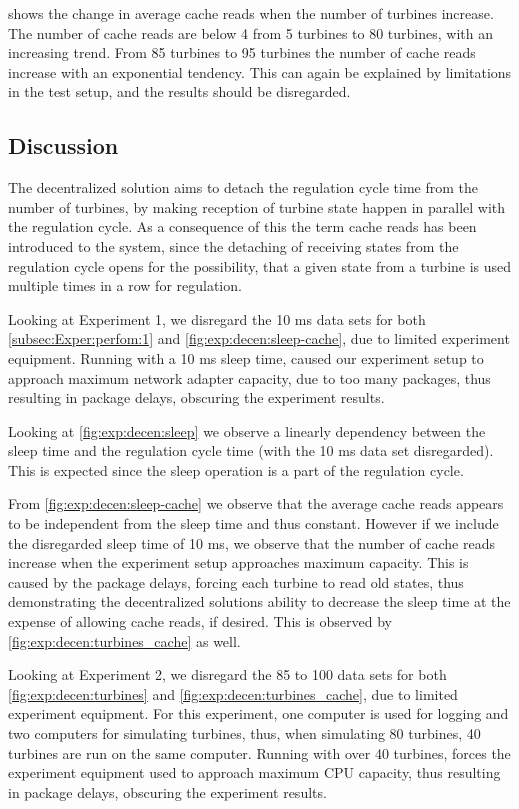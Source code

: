  shows the change in average cache reads when the number of turbines increase. The number of cache reads are below 4 from 5 turbines to 80 turbines, with an increasing trend. From 85 turbines to 95 turbines the number of cache reads increase with an exponential tendency. This can again be explained by limitations in the test setup, and the results should be disregarded.
        
        
\subsection{Discussion} 
The decentralized solution aims to detach the regulation cycle time from the number of turbines, by making reception of turbine state happen in parallel with the regulation cycle. As a consequence of this the term cache reads has been introduced to the system, since the detaching of receiving states from the regulation cycle opens for the possibility, that a given state from a turbine is used multiple times in a row for regulation. 

Looking at Experiment 1, we disregard the 10 ms data sets for both \cref{subsec:Exper:perfom:1} and \cref{fig:exp:decen:sleep-cache}, due to limited experiment equipment. Running with a 10 ms sleep time, caused our experiment setup to approach maximum network adapter capacity, due to too many packages, thus resulting in package delays, obscuring the experiment results.

Looking at \cref{fig:exp:decen:sleep} we observe a linearly dependency between the sleep time and the regulation cycle time (with the 10 ms data set disregarded). This is expected since the sleep operation is a part of the regulation cycle. 

From \cref{fig:exp:decen:sleep-cache} we observe that the average cache reads appears to be independent from the sleep time and thus constant. However if we include the disregarded sleep time of 10 ms, we observe that the number of cache reads increase when the experiment setup approaches maximum capacity. This is caused by the package delays, forcing each turbine to read old states, thus demonstrating the decentralized solutions ability to decrease the sleep time at the expense of allowing cache reads, if desired. This is observed by \cref{fig:exp:decen:turbines_cache} as well. 

Looking at Experiment 2, we disregard the 85 to 100 data sets for both \cref{fig:exp:decen:turbines} and \cref{fig:exp:decen:turbines_cache}, due to limited experiment equipment. For this experiment, one computer is used for logging and two computers for simulating turbines, thus, when simulating 80 turbines, 40 turbines are run on the same computer. Running with over 40 turbines, forces the experiment equipment used to approach maximum CPU capacity, thus resulting in package delays, obscuring the experiment results.

